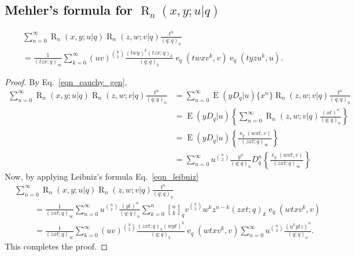 \documentclass{cimart}
\newcommand{\qbinom}{\genfrac{[}{]}{0pt}{}}
\DeclareMathOperator{\ope}{e}
\DeclareMathOperator{\opE}{E}
\DeclareMathOperator{\opR}{R}
\begin{document}
\subsection{Mehler's formula for \texorpdfstring{$\opR_{n}(x,y;u|q)$}{r\_n(x,y;u|q)}}
\begin{theorem}\label{theo_mehler}
    \begin{multline}
        \sum_{n=0}^{\infty}\opR_{n}(x,y;u|q)\opR_{n}(z,w;v|q)\frac{t^n}{(q;q)_{n}}\\
        =\frac{1}{(tzx;q)_{\infty}}\sum_{k=0}^{\infty}(uv)^{\binom{k}{2}}\frac{(twy)^k(tzx;q)_{k}}{(q;q)_{k}}\ope_{q}(twxv^k,v)\ope_{q}(tyzu^k,u).
    \end{multline}
\end{theorem}
\begin{proof}
By Eq.~\eqref{eqn_cauchy_gen},
    \begin{align*}
        \sum_{n=0}^{\infty}\opR_{n}(x,y;u|q)\opR_{n}(z,w;v|q)\frac{t^n}{(q;q)_{n}}
        &=\sum_{n=0}^{\infty}\opE(yD_{q}|u)\{x^n\}\opR_{n}(z,w;v|q)\frac{t^n}{(q;q)_{n}}\\
        &=\opE(yD_{q}|u)\left\{\sum_{n=0}^{\infty}\opR_{n}(z,w;v|q)\frac{(xt)^n}{(q;q)_{n}}\right\}\\
        &=\opE(yD_{q}|u)\left\{\frac{\ope_{q}(wxt,v)}{(zxt;q)_{\infty}}\right\}\\
        &=\sum_{n=0}^{\infty}u^{\binom{n}{2}}\frac{y^n}{(q;q)_{n}}D_{q}^n\left\{\frac{\ope_{q}(wxt,v)}{(zxt;q)_{\infty}}\right\}
    \end{align*}
Now, by applying Leibniz's formula Eq.~\eqref{eqn_leibniz}    
    \begin{align*}
        &\sum_{n=0}^{\infty}\opR_{n}(x,y;u|q)\opR_{n}(z,w;v|q)\frac{t^n}{(q;q)_{n}}\\
        &\hspace{1cm}=\frac{1}{(zxt;q)_{\infty}}\sum_{n=0}^{\infty}u^{\binom{n}{2}}\frac{(yt)^n}{(q;q)_{n}}\sum_{k=0}^{n}\qbinom{n}{k}_{q}v^{\binom{k}{2}}w^kz^{n-k}(zxt;q)_{k}\ope_{q}(wtxv^k,v)\\
        &\hspace{1cm}=\frac{1}{(zxt;q)_{\infty}}\sum_{k=0}^{\infty}(uv)^{\binom{k}{2}}\frac{(zxt;q)_{k}(wyt)^k}{(q;q)_{k}}\ope_{q}(wtxv^k,v)\sum_{n=0}^{\infty}u^{\binom{n}{2}}\frac{(u^kytz)^n}{(q;q)_{n}}.
    \end{align*}
This completes the proof.
\end{proof}
\end{document}
